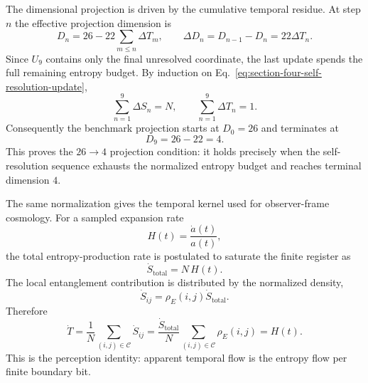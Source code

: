 \documentclass[11pt,letterpaper]{article}
\theoremstyle{plain}
\newcommand{\Nbits}{N}
\begin{document}
The dimensional projection is driven by the cumulative temporal residue.  At
step $n$ the effective projection dimension is
\begin{equation}
\label{eq:section-four-projection-dimension}
 D_n
 =
 26-22\sum_{m\le n}\Delta T_m,
 \qquad
 \Delta D_n=D_{n-1}-D_n=22\Delta T_n.
\end{equation}
Since $U_9$ contains only the final unresolved coordinate, the last update
spends the full remaining entropy budget.  By induction on
Eq.~\eqref{eq:section-four-self-resolution-update},
\begin{equation}
\label{eq:section-four-total-resolved-entropy}
 \sum_{n=1}^{9}\Delta S_n=\Nbits,
 \qquad
 \sum_{n=1}^{9}\Delta T_n=1.
\end{equation}
Consequently the benchmark projection starts at $D_0=26$ and terminates at
\begin{equation}
\label{eq:section-four-projection-26-to-4}
 D_9=26-22=4.
\end{equation}
This proves the $26\to4$ projection condition: it holds precisely when the
self-resolution sequence exhausts the normalized entropy budget and reaches
terminal dimension $4$.

The same normalization gives the temporal kernel used for observer-frame
cosmology.  For a sampled expansion rate
\begin{equation}
\label{eq:section-four-hubble-rate}
 H(t)=\frac{\dot a(t)}{a(t)},
\end{equation}
the total entropy-production rate is postulated to saturate the finite register
as
\begin{equation}
\label{eq:section-four-total-entropy-rate}
 \dot S_{\text{total}}=\Nbits\,H(t).
\end{equation}
The local entanglement contribution is distributed by the normalized density,
\begin{equation}
\label{eq:section-four-local-entropy-rate}
 \dot S_{ij}=\rho_E(i,j)\dot S_{\text{total}}.
\end{equation}
Therefore
\begin{equation}
\label{eq:section-four-perception-identity}
 \dot T
 =
 \frac{1}{\Nbits}\sum_{(i,j)\in\mathcal C}\dot S_{ij}
 =
 \frac{\dot S_{\text{total}}}{\Nbits}
 \sum_{(i,j)\in\mathcal C}\rho_E(i,j)
 =
 H(t).
\end{equation}
This is the perception identity: apparent temporal flow is the entropy flow per
finite boundary bit.
\end{document}
